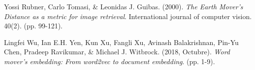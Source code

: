 \documentclass[12pt,a4paper]{article}
\begin{document}
\begin{sloppypar}
\begin{thebibliography}{9}
Yossi Rubner, Carlo Tomasi, \& Leonidas J. Guibas. (2000). \textit{The Earth Mover’s Distance as a metric for image retrieval}. International journal of computer vision. 40(2). (pp. 99-121).

Lingfei Wu, Ian E.H. Yen, Kun Xu, Fangli Xu, Avinash Balakrishnan, Pin-Yu Chen, Pradeep Ravikumar, \& Michael J. Witbrock. (2018, Octubre). \textit{Word mover’s embedding: From word2vec to document embedding}. (pp. 1-9).

\end{thebibliography}

\end{sloppypar}
\end{document}
